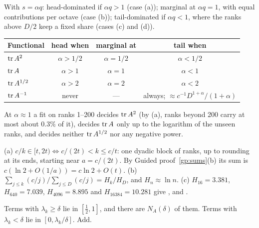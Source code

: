 With $s=\alpha q$: head-dominated if $\alpha q>1$ (case (a)); marginal at $\alpha q=1$, with equal contributions per
octave (case (b)); tail-dominated if $\alpha q<1$, where the ranks above $D/2$ keep a fixed share (cases (c) and (d)).
\begin{center}
\begin{tabular}{lccc}
\toprule
Functional & head when & marginal at & tail when\\
\midrule
$\operatorname{tr} A^2$ & $\alpha>1/2$ & $\alpha=1/2$ & $\alpha<1/2$\\
$\operatorname{tr} A$ & $\alpha>1$ & $\alpha=1$ & $\alpha<1$\\
$\operatorname{tr} A^{1/2}$ & $\alpha>2$ & $\alpha=2$ & $\alpha<2$\\
$\operatorname{tr} A^{-1}$ & never & --- & always; $\approx c^{-1}D^{1+\alpha}/(1+\alpha)$\\
\bottomrule
\end{tabular}
\end{center}
At $\alpha\approx1$ a fit on ranks 1--200 decides $\operatorname{tr} A^2$ (by (a), ranks beyond 200 carry at most about $0.3\%$ of
it), decides $\operatorname{tr} A$ only up to the logarithm of the unseen ranks, and decides neither $\operatorname{tr} A^{1/2}$ nor any negative
power.

(a) $c/k\in[t,2t)\iff c/(2t)<k\le c/t$: one dyadic block of ranks, up to rounding at its ends, starting near
$a=c/(2t)$. By Guided proof~\ref{gp:sums}(b) its sum is $c(\ln2+O(1/a))=c\ln2+O(t)$.
\newline (b) $\sum_{j\le k}(c/j)/\sum_{j\le D}(c/j)=H_k/H_D$, and $H_n\approx\ln n$.
\newline (c) $H_{16}=3.381$, $H_{640}=7.039$, $H_{4096}=8.895$ and $H_{16384}=10.281$ give \NumShareSixForty, \NumShareFourK{}
and \NumShareSixteenK.

Terms with $\lambda_k\ge\delta$ lie in $[\frac12,1]$, and there are $N_A(\delta)$ of them. Terms with $\lambda_k<\delta$
lie in $[0,\lambda_k/\delta]$. Add.

